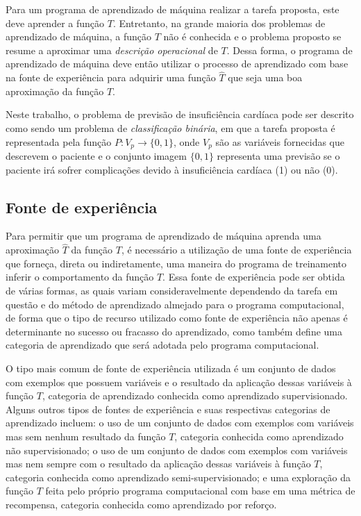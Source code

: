 Para um programa de aprendizado de máquina realizar a tarefa proposta, este deve aprender a função $T$. Entretanto, na grande maioria dos problemas de aprendizado de máquina, a função $T$ não é conhecida e o problema proposto se resume a aproximar uma \textit{descrição operacional} de $T$\cite[p.8]{machine_learning}. Dessa forma, o programa de aprendizado de máquina deve então utilizar o processo de aprendizado com base na fonte de experiência para adquirir uma função $\hat{T}$ que seja uma boa aproximação da função $T$.

Neste trabalho, o problema de previsão de insuficiência cardíaca pode ser descrito como sendo um problema de \textit{classificação binária}, em que a tarefa proposta é representada pela função $P : V_{p} \rightarrow \{0, 1\}$, onde $V_{p}$ são as variáveis fornecidas que descrevem o paciente e o conjunto imagem $\{0, 1\}$ representa uma previsão se o paciente irá sofrer complicações devido à insuficiência cardíaca (1) ou não (0).

\subsection{Fonte de experiência}

Para permitir que um programa de aprendizado de máquina aprenda uma aproximação $\hat{T}$ da função $T$, é necessário a utilização de uma fonte de experiência que forneça, direta ou indiretamente, uma maneira do programa de treinamento inferir o comportamento da função $T$. Essa fonte de experiência pode ser obtida de várias formas, as quais variam consideravelmente dependendo da tarefa em questão e do método de aprendizado almejado para o programa computacional, de forma que o tipo de recurso utilizado como fonte de experiência não apenas é determinante no sucesso ou fracasso do aprendizado, como também define uma categoria de aprendizado que será adotada pelo programa computacional.

O tipo mais comum de fonte de experiência utilizada é um conjunto de dados com exemplos que possuem variáveis e o resultado da aplicação dessas variáveis à função $T$, categoria de aprendizado conhecida como aprendizado supervisionado. Alguns outros tipos de fontes de experiência e suas respectivas categorias de aprendizado incluem: o uso de um conjunto de dados com exemplos com variáveis mas sem nenhum resultado da função $T$, categoria conhecida como aprendizado não supervisionado; o uso de um conjunto de dados com exemplos com variáveis mas nem sempre com o resultado da aplicação dessas variáveis à função $T$, categoria conhecida como aprendizado semi-supervisionado; e uma exploração da função $T$ feita pelo próprio programa computacional com base em uma métrica de recompensa, categoria conhecida como aprendizado por reforço.

